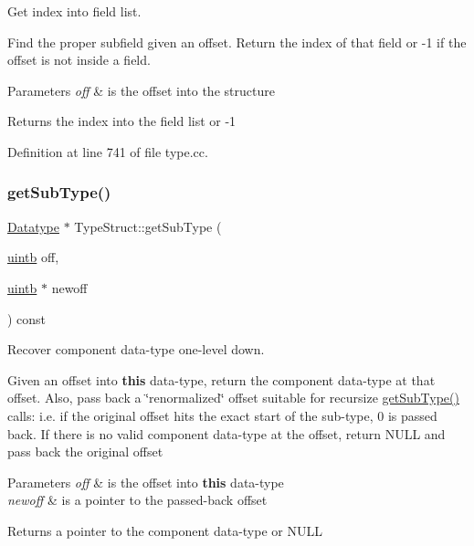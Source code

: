 Get index into field list. 

Find the proper subfield given an offset. Return the index of that field or -\/1 if the offset is not inside a field. 
\begin{DoxyParams}{Parameters}
{\em off} & is the offset into the structure \\
\hline
\end{DoxyParams}
\begin{DoxyReturn}{Returns}
the index into the field list or -\/1 
\end{DoxyReturn}


Definition at line 741 of file type.\+cc.

\mbox{\label{class_type_struct_abf638d0fc1902b030f0134c5152a3818}} 
\subsubsection{\texorpdfstring{getSubType()}{getSubType()}}
{\footnotesize\ttfamily \mbox{\hyperlink{class_datatype}{Datatype}} $\ast$ Type\+Struct\+::get\+Sub\+Type (\begin{DoxyParamCaption}\item[{\mbox{\hyperlink{types_8h_a2db313c5d32a12b01d26ac9b3bca178f}{uintb}}}]{off,  }\item[{\mbox{\hyperlink{types_8h_a2db313c5d32a12b01d26ac9b3bca178f}{uintb}} $\ast$}]{newoff }\end{DoxyParamCaption}) const\hspace{0.3cm}{\ttfamily [virtual]}}



Recover component data-\/type one-\/level down. 

Given an offset into {\bfseries{this}} data-\/type, return the component data-\/type at that offset. Also, pass back a \char`\"{}renormalized\char`\"{} offset suitable for recursize \mbox{\hyperlink{class_type_struct_abf638d0fc1902b030f0134c5152a3818}{get\+Sub\+Type()}} calls\+: i.\+e. if the original offset hits the exact start of the sub-\/type, 0 is passed back. If there is no valid component data-\/type at the offset, return N\+U\+LL and pass back the original offset 
\begin{DoxyParams}{Parameters}
{\em off} & is the offset into {\bfseries{this}} data-\/type \\
\hline
{\em newoff} & is a pointer to the passed-\/back offset \\
\hline
\end{DoxyParams}
\begin{DoxyReturn}{Returns}
a pointer to the component data-\/type or N\+U\+LL 
\end{DoxyReturn}



